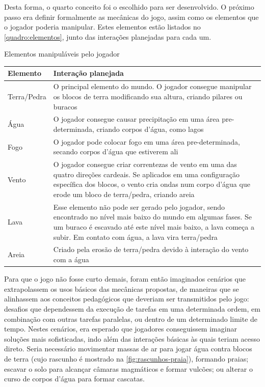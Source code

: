 Desta forma, o quarto conceito foi o escolhido para ser desenvolvido. O próximo passo era definir formalmente as mecânicas do jogo, assim como os elementos que o jogador poderia manipular. Estes elementos estão listados no \autoref{quadro:elementos}, junto das interações planejadas para cada um.

\begin{quadro}[htb] 
	\centering
	\caption[Elementos manipuláveis pelo jogador]{Elementos manipuláveis pelo jogador}
	
	\begin{tabular} {| >{\centering\arraybackslash} m{3cm} | >{\centering\arraybackslash} m{9cm} |}
		\hline
		\textbf{Elemento} & \textbf{Interação planejada} \\
		\hline
		Terra/Pedra & O principal elemento do mundo. O jogador consegue manipular os blocos de terra modificando sua altura, criando pilares ou buracos \\
		\hline
		Água & O jogador consegue causar precipitação em uma área pre-determinada, criando corpos d'água, como lagos \\
		\hline
		Fogo & O jogador pode colocar fogo em uma área pre-determinada, secando corpos d'água que estiverem ali \\
		\hline
		Vento & O jogador consegue criar correntezas de vento em uma das quatro direções cardeais. Se aplicados em uma configuração específica dos blocos, o vento cria ondas num corpo d'água que erode um bloco de terra/pedra, criando areia \\
		\hline
		Lava & Esse elemento não pode ser gerado pelo jogador, sendo encontrado no nível mais baixo do mundo em algumas fases. Se um buraco é escavado até este nível mais baixo, a lava começa a subir. Em contato com água, a lava vira terra/pedra \\
		\hline
		Areia & Criado pela erosão de terra/pedra devido à interação do vento com a água \\
		\hline
	\end{tabular}
	
	\legend{\fonteAP}
	\label{quadro:elementos}
\end{quadro}

Para que o jogo não fosse curto demais, foram então imaginados cenários 
que extrapolassem os usos básicos das 
mecânicas propostas, de maneiras que se alinhassem aos conceitos pedagógicos 
que deveriam ser transmitidos pelo jogo: desafios que dependessem da execução 
de tarefas em uma determinada ordem, em combinação com outras tarefas paralelas, 
ou dentro de um determinado limite de tempo. Nestes cenários, era esperado 
que jogadores conseguissem imaginar soluções mais sofisticadas, indo além 
das interações básicas às quais teriam acesso direto. Seria necessário 
movimentar massas de ar para jogar água contra blocos de terra (cujo rascunho 
é mostrado na \autoref{fig:rascunhos-praia}), formando 
praias; escavar o solo para alcançar câmaras magmáticos e formar vulcões; ou 
alterar o curso de corpos d'água para formar cascatas.

